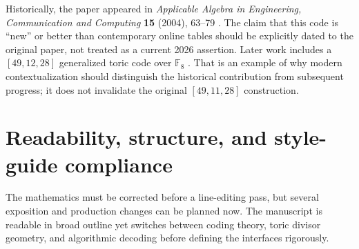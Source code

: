 \documentclass[12pt,letterpaper]{article}
\newcommand{\F}{\mathbb F}
\begin{document}
Historically, the paper appeared in \emph{Applicable Algebra in Engineering, Communication and Computing} \textbf{15} (2004), 63--79 \cite{Jo04}.  The claim that this code is ``new'' or better than contemporary online tables should be explicitly dated to the original paper, not treated as a current 2026 assertion.  Later work includes a $[49,12,28]$ generalized toric code over $\F_8$ \cite{Li11}.  That is an example of why modern contextualization should distinguish the historical contribution from subsequent progress; it does not invalidate the original $[49,11,28]$ construction.

\section{Readability, structure, and style-guide compliance}\label{sec:style}
The mathematics must be corrected before a line-editing pass, but several exposition and production changes can be planned now.  The manuscript is readable in broad outline yet switches between coding theory, toric divisor geometry, and algorithmic decoding before defining the interfaces rigorously.
\end{document}

